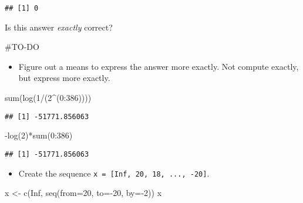 \documentclass[
]{article}
\newenvironment{Shaded}{\begin{snugshade}}{\end{snugshade}}
\newcommand{\AttributeTok}[1]{\textcolor[rgb]{0.77,0.63,0.00}{#1}}
\newcommand{\ConstantTok}[1]{\textcolor[rgb]{0.00,0.00,0.00}{#1}}
\newcommand{\DecValTok}[1]{\textcolor[rgb]{0.00,0.00,0.81}{#1}}
\newcommand{\FunctionTok}[1]{\textcolor[rgb]{0.00,0.00,0.00}{#1}}
\newcommand{\NormalTok}[1]{#1}
\newcommand{\OtherTok}[1]{\textcolor[rgb]{0.56,0.35,0.01}{#1}}
\newcommand{\SpecialCharTok}[1]{\textcolor[rgb]{0.00,0.00,0.00}{#1}}
\providecommand{\tightlist}{%
  \setlength{\itemsep}{0pt}\setlength{\parskip}{0pt}}
\begin{document}
\begin{verbatim}
## [1] 0
\end{verbatim}

Is this answer \emph{exactly} correct?

\#TO-DO

\begin{itemize}
\tightlist
\item
  Figure out a means to express the answer more exactly. Not compute
  exactly, but express more exactly.
\end{itemize}

\begin{Shaded}
\begin{Highlighting}[]
\FunctionTok{sum}\NormalTok{(}\FunctionTok{log}\NormalTok{(}\DecValTok{1}\SpecialCharTok{/}\NormalTok{(}\DecValTok{2}\SpecialCharTok{\^{}}\NormalTok{(}\DecValTok{0}\SpecialCharTok{:}\DecValTok{386}\NormalTok{))))}
\end{Highlighting}
\end{Shaded}

\begin{verbatim}
## [1] -51771.856063
\end{verbatim}

\begin{Shaded}
\begin{Highlighting}[]
\SpecialCharTok{{-}}\FunctionTok{log}\NormalTok{(}\DecValTok{2}\NormalTok{)}\SpecialCharTok{*}\FunctionTok{sum}\NormalTok{(}\DecValTok{0}\SpecialCharTok{:}\DecValTok{386}\NormalTok{)}
\end{Highlighting}
\end{Shaded}

\begin{verbatim}
## [1] -51771.856063
\end{verbatim}

\begin{itemize}
\tightlist
\item
  Create the sequence \texttt{x\ =\ {[}Inf,\ 20,\ 18,\ ...,\ -20{]}}.
\end{itemize}

\begin{Shaded}
\begin{Highlighting}[]
\NormalTok{x }\OtherTok{\textless{}{-}} \FunctionTok{c}\NormalTok{(}\ConstantTok{Inf}\NormalTok{, }\FunctionTok{seq}\NormalTok{(}\AttributeTok{from=}\DecValTok{20}\NormalTok{, }\AttributeTok{to=}\SpecialCharTok{{-}}\DecValTok{20}\NormalTok{, }\AttributeTok{by=}\SpecialCharTok{{-}}\DecValTok{2}\NormalTok{))}
\NormalTok{x}
\end{Highlighting}
\end{Shaded}
\end{document}
